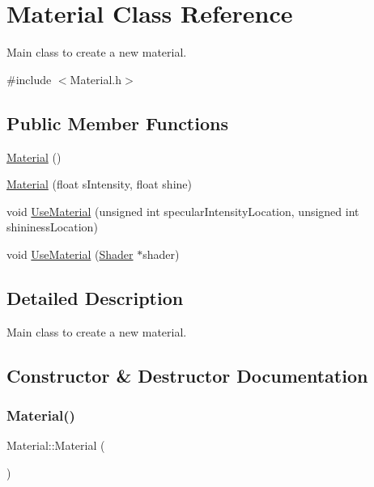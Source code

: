 \hypertarget{class_material}{}\section{Material Class Reference}
\label{class_material}


Main class to create a new material.  




{\ttfamily \#include $<$Material.\+h$>$}

\subsection*{Public Member Functions}
\begin{DoxyCompactItemize}
\item 
\mbox{\hyperlink{class_material_a137e987401b63eb7c6c27c3e38bc74b5}{Material}} ()
\item 
\mbox{\hyperlink{class_material_a6e4e2f31f8f1a193607e467e9986672d}{Material}} (float s\+Intensity, float shine)
\item 
void \mbox{\hyperlink{class_material_a3b3ca5e07da7cac545454afd4a7936b9}{Use\+Material}} (unsigned int specular\+Intensity\+Location, unsigned int shininess\+Location)
\item 
void \mbox{\hyperlink{class_material_ae465e6c8c0ed52a5cabc5ccced8f20de}{Use\+Material}} (\mbox{\hyperlink{class_shader}{Shader}} $\ast$shader)
\end{DoxyCompactItemize}


\subsection{Detailed Description}
Main class to create a new material. 

\subsection{Constructor \& Destructor Documentation}
\mbox{\label{class_material_a137e987401b63eb7c6c27c3e38bc74b5}} 
\subsubsection{\texorpdfstring{Material()}{Material()}\hspace{0.1cm}{\footnotesize\ttfamily [1/2]}}
{\footnotesize\ttfamily Material\+::\+Material (\begin{DoxyParamCaption}{ }\end{DoxyParamCaption})}

